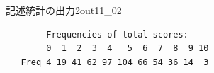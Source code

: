 \begin{Rscreen}{記述統計の出力2}{out11_02}
	\begin{verbatim}
        Frequencies of total scores:
        0  1  2  3  4   5  6  7  8  9 10
   Freq 4 19 41 62 97 104 66 54 36 14  3
    \end{verbatim}
\end{Rscreen}
